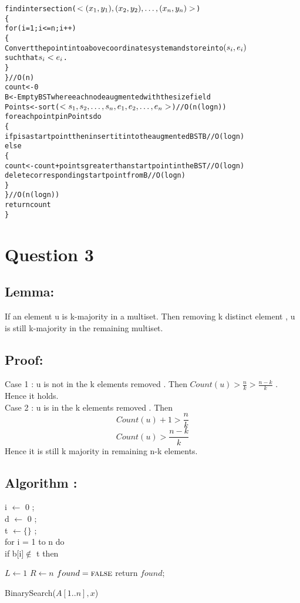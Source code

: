 \documentclass{article}
\begin{document}
\begin{alltt}
findintersection(\(<(x\sb1,y\sb1),(x\sb2,y\sb2),\ldots ,(x\sb{n},y\sb{n})>\)) 
\{ 
for (i=1;i<=n;i++)
    \{
        Convert the point into above coordinate system and store into \((s\sb{i},e\sb{i})\) 
        such that \(s\sb{i} < e\sb{i}\) .
    \}
\}                                                                           // O (n)
count <- 0 
B <- Empty BST where each node augmented with the size field
Points <- sort (\(<s\sb1,s\sb2,\ldots,s\sb{n},e\sb1,e\sb2,\ldots,e\sb{n}>\))                              //O(n(log n)) 
foreach point p in Points do 
    \{
    if p is a start point then insert it into the augmented BST B            // O(log n)
    else 
        \{  
            count <- count + points greater than start point in the BST      // O(log n)
            delete corresponding startpoint from B                           // O(log n)
        \}
    \}                                                                       // O(n(log n))
    return count 
\}
\end{alltt}
	
\section*{Question 3}
\subsection*{Lemma:} If an element u is k-majority in a multiset. Then removing k distinct element , u is still k-majority in the remaining multiset. 
\subsection*{Proof:}
Case 1 : u is not in the k elements removed .  Then $Count(u)>\frac{n}{k}>\frac{n-k}{k}$ . Hence it holds. \\
Case 2 : u is in the k elements removed . Then 
\[Count(u)+1>\frac{n}{k}\]
\[Count(u)>\frac{n-k}{k}\]
Hence it is still k majority in remaining n-k elements.

\subsection*{Algorithm :}
i $\leftarrow$ 0 ; \\
d $\leftarrow$ 0 ; \\
t $\leftarrow \lbrace \rbrace$ ; \\
for i = 1 to n do \\
\indent if b[i]$\notin$ t then 
\begin{algorithm}
  $L \leftarrow 1$\;
  $R \leftarrow n$\;
  $found = \textsc{false}$\;
  return $found$;
\caption{BinarySearch($A[1..n], x$)}
\label{bin-search}

\end{algorithm}
\end{document}
